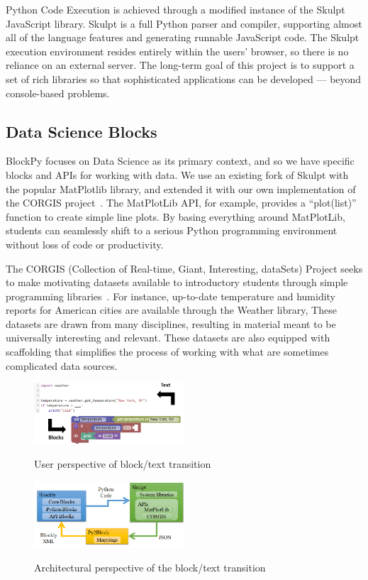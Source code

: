 \documentclass{sig-alternate}
\begin{document}
Python Code Execution is achieved through a modified instance of the Skulpt JavaScript library.
Skulpt is a full Python parser and compiler, supporting almost all of the language features and generating runnable JavaScript code.
The Skulpt execution environment resides entirely within the users' browser, so there is no reliance on an external server.
The long-term goal of this project is to support a set of rich libraries so that sophisticated applications can be developed --- beyond console-based problems.

\subsection{Data Science Blocks}

BlockPy focuses on Data Science as its primary context, and so we have specific blocks and APIs for working with data.
We use an existing fork of Skulpt with the popular MatPlotlib library, and extended it with our own implementation of the CORGIS project~\cite{CORGIS}.
The MatPlotLib API, for example, provides a ``plot(list)'' function to create simple line plots.
By basing everything around MatPlotLib, students can seamlessly shift to a serious Python programming environment without loss of code or productivity. 

The CORGIS (Collection of Real-time, Giant, Interesting, dataSets) Project seeks to make motivating datasets available to introductory students through simple programming libraries~\cite{CORGIS}.
For instance, up-to-date temperature and humidity reports for American cities are available through the Weather library, 
These datasets are drawn from many disciplines, resulting in material meant to be universally interesting and relevant.
These datasets are also equipped with scaffolding that simplifies the process of working with what are sometimes complicated data sources.

\begin{figure}
\includegraphics[width=0.5\textwidth]{images/mltExample}
\label{fig-mlt-user}
\caption{User perspective of block/text transition}
\end{figure}

\begin{figure}
\includegraphics[width=0.5\textwidth]{images/mltOverview}
\label{fig-mlt-architecture}
\caption{Architectural perspective of the block/text transition}
\end{figure}
\end{document}
